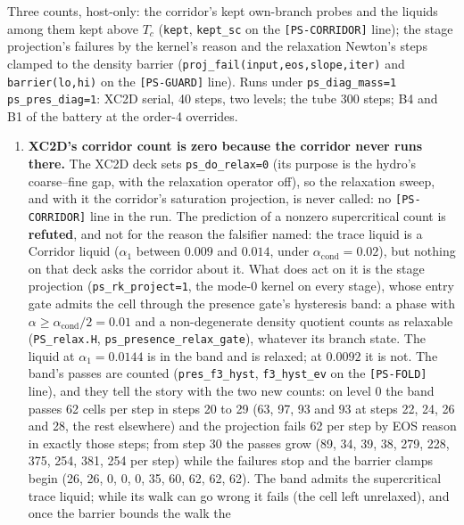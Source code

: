\documentclass[11pt,a4paper]{article}
\newcommand{\code}[1]{\texttt{\small #1}}
\begin{document}
Three counts, host-only: the corridor's kept own-branch probes and the
liquids among them kept above $T_c$ (\code{kept}, \code{kept\_sc} on
the \code{[PS-CORRIDOR]} line); the stage projection's failures by the
kernel's reason and the relaxation Newton's steps clamped to the density
barrier (\code{proj\_fail(input,eos,slope,iter)} and
\code{barrier(lo,hi)} on the \code{[PS-GUARD]} line).  Runs under
\code{ps\_diag\_mass=1 ps\_pres\_diag=1}: XC2D serial, 40 steps, two
levels; the tube 300 steps; B4 and B1 of the battery at the order-4
overrides.
\begin{enumerate}[nosep]
\item \textbf{XC2D's corridor count is zero because the corridor never
      runs there.}  The XC2D deck sets \code{ps\_do\_relax=0} (its
      purpose is the hydro's coarse--fine gap, with the relaxation
      operator off), so the relaxation sweep, and with it the corridor's
      saturation projection, is never called: no \code{[PS-CORRIDOR]}
      line in the run.  The prediction of a nonzero supercritical count
      is \textbf{refuted}, and not for the reason the falsifier named:
      the trace liquid is a Corridor liquid ($\alpha_1$ between $0.009$
      and $0.014$, under $\alpha_{\mathrm{cond}} = 0.02$), but nothing
      on that deck asks the corridor about it.  What does act on it is
      the stage projection (\code{ps\_rk\_project=1}, the mode-0 kernel
      on every stage), whose entry gate admits the cell through the
      presence gate's hysteresis band: a phase with
      $\alpha \ge \alpha_{\mathrm{cond}}/2 = 0.01$ and a non-degenerate
      density quotient counts as relaxable (\code{PS\_relax.H},
      \code{ps\_presence\_relax\_gate}), whatever its branch state.  The
      liquid at $\alpha_1 = 0.0144$ is in the band and is relaxed; at
      $0.0092$ it is not.  The band's passes are counted
      (\code{pres\_f3\_hyst}, \code{f3\_hyst\_ev} on the \code{[PS-FOLD]}
      line), and they tell the story with the two new counts: on level 0
      the band passes 62 cells per step in steps 20 to 29 (63, 97, 93
      and 93 at steps 22, 24, 26 and 28, the rest elsewhere) and the
      projection fails 62 per step by EOS reason in exactly those steps;
      from step 30 the passes grow (89, 34, 39, 38, 279, 228, 375, 254,
      381, 254 per step) while the failures stop and the barrier clamps
      begin (26, 26, 0, 0, 0, 35, 60, 62, 62, 62).  The band admits the
      supercritical trace liquid; while its walk can go wrong it fails
      (the cell left unrelaxed), and once the barrier bounds the walk the

\end{enumerate}
\end{document}
